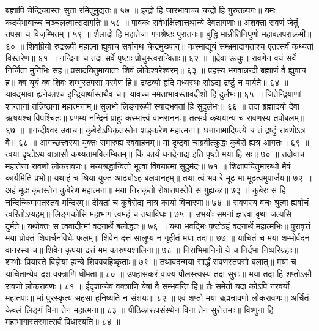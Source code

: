 ब्रह्मापि चेन्द्रियग्रस्तः सुता रमितुमुद्यतः॥ ५७ ॥
इन्द्रो हि जारभावाच्च चन्द्रो हि गुरुतल्पगः॥
यमः कदर्यभावाच्च चञ्चलत्वात्सदागतिः॥ ५८ ॥
पावकः सर्वभक्षित्वात्तथान्ये देवतागणाः॥
अशक्ता रावणं जेतुं तपसा च विजृम्भितम्॥ ५९ ॥
शैलादो हि महातेजा गणश्रेष्ठः पुरातनः॥
बुद्धि मान्नीतिनिपुणो महाबलपराक्रमी॥ ६० ॥
शिवप्रियो रुद्ररूपी महात्मा ह्युवाच सर्वानथ चेन्द्रमुख्यान्॥
कस्माद्यूयं सम्भ्रमादागताश्च एतत्सर्वं कथ्यतां विस्तरेण॥ ६१ ॥
नन्दिना च तदा सर्वे पृष्टाः प्रोचुस्त्वरान्विताः॥ ६२ ॥
॥देवा ऊचुः॥
रावणेन वयं सर्वे निर्जिता मुनिभिः सह॥
प्रसादयितुमायाताः शिवं लोकेश्वरेश्वरम्॥ ६३ ॥
प्रहस्य भगवान्नन्दी ब्रह्माणं वै ह्युवाच ह॥
क्व यूयं क्व शिवः शम्भुस्तपसा परमेण हि॥
द्रष्टव्यो हृदि मध्यस्थः सोऽद्य द्रष्टुं न पार्यते॥ ६४ ॥
यावद्भावा ह्यनेकाश्च इन्द्रियार्थास्तथैव च॥
यावच्च ममताभावस्तावदीशो हि दुर्लभः॥ ६५ ॥
जितेन्द्रियाणां शान्तानां तन्निष्ठानां महात्मनाम्॥
सुलभो लिङ्गरूपी स्याद्भवतां हि सुदुर्लभः॥ ६६ ॥
तदा ब्रह्मादयो देवा ऋषयश्च विपश्चितः॥
प्रणम्य नन्दिनं प्राहुः कस्मात्त्वं वानराननः॥
तत्सर्वं कथयान्यं च रावणस्य तपोबलम्॥ ६७ ॥
॥नन्दीश्वर उवाच॥
कुबेरोऽधिकृतस्तेन शङ्करेण महात्मना॥
धनानामादिपत्ये च तं द्रष्टुं रावणोऽत्र वै॥ ६८ ॥
आगच्छत्त्वरया युक्तः समारुह्य स्ववाहनम्॥
मां दृष्ट्वा चाब्रवीत्क्रुद्धः कुबेरो ह्यत्र आगतः॥ ६९ ॥
त्वया दृष्टोऽथ वात्रासौ कथ्यतामविलम्बितम्॥
किं कार्यं धनदेनाद्य इति पृष्टो मया हि सः॥ ७० ॥
तदोवाच महातेजा रावणो लोकरावणः॥
मय्यश्रद्धान्वितो भूत्वा विषयात्मा सुदुर्मदः॥ ७१ ॥
शिक्षापयितुमारब्धो मैवं कार्यमिति प्रभो॥
यथाहं च श्रिया युक्त आढ्योऽहं बलवानहम्॥
तथा त्वं भव रे मूढ मा मूढत्वमुपार्जय॥ ७२ ॥
अहं मूढः कृतस्तेन कुबेरेण महात्मना॥
मया निराकृतो रोषात्तपस्तेपे स गुह्यकः॥ ७३ ॥
कुबेरः स हि नन्दिन्किमागतस्तव मन्दिरम्॥
दीयतां च कुबेरोद्य नात्र कार्या विचारणा॥ ७४ ॥
रावणस्य वचः श्रुत्वा ह्यवोचं त्वरितोऽप्यहम्॥
लिङ्गकोसि महाभाग त्वमहं च तथाविधः॥ ७५ ॥
उभयोः समनां ज्ञात्वा वृथा जल्पसि दुर्मते॥
यथोक्तः स त्ववादीन्मां वदनार्थे बलोद्धतः॥ ७६ ॥
यथा भवद्भिः पृष्टोऽहं वदनार्थे महात्मभिः॥
पुरावृत्तं मया प्रोक्तं शिवार्चनविधेः फलम्॥
शिवेन दत्तं सालूप्यं न गृहीतं मया तदा॥ ७७ ॥
याचितं च मया शम्भोर्वदनं वानरस्य च॥
शिवेन कृपया दत्तं मम कारुण्यशालिना॥ ७८ ॥
निराभिमानिनो ये च निर्दभा निष्परिग्रहाः॥
शम्भोः प्रियास्ते विज्ञेया ह्यन्ये शिववबहिष्कृताः॥ ७९ ॥
तथावदन्मया सार्द्धं रावणस्तपसो बलात्॥
मया च याचितान्येव दश वक्त्राणि धीमता॥ ८० ॥
उपहासकरं वाक्यं पौलस्त्यस्य तदा सुराः॥
मया तदा हि शप्तोऽसौ रावणो लोकरावणः॥ ८१ ॥
ईदृशान्येव वक्त्राणि येषां वै सम्भवन्ति हि॥
तैः समेतो यदा कोऽपि नरवर्यो महातपाः॥
मां पुरस्कृत्य सहसा हनिष्यति न संशयः॥ ८२ ॥
एवं शप्तो मया ब्रह्मन्रावणो लोकरावणः॥
अर्चितं केवलं लिङ्गं विना तेन महात्मना॥ ८३ ॥
पीठिकारूपसंस्थेन विना तेन सुरोत्तमाः॥
विष्णुना हि महाभागास्तस्मात्सर्वं विधास्यति॥ ८४ ॥

